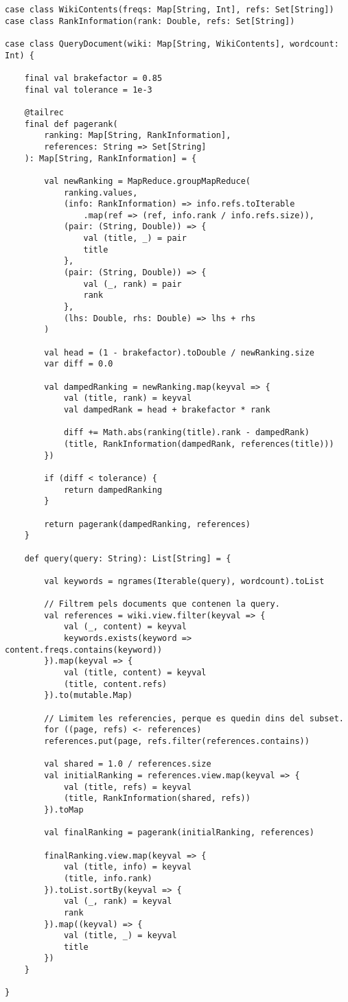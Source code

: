 \documentclass{article}
\begin{document}
\begin{lstlisting}
case class WikiContents(freqs: Map[String, Int], refs: Set[String])
case class RankInformation(rank: Double, refs: Set[String])

case class QueryDocument(wiki: Map[String, WikiContents], wordcount: Int) {

	final val brakefactor = 0.85
	final val tolerance = 1e-3

	@tailrec
	final def pagerank(
		ranking: Map[String, RankInformation],
		references: String => Set[String]
	): Map[String, RankInformation] = {

		val newRanking = MapReduce.groupMapReduce(
			ranking.values,
			(info: RankInformation) => info.refs.toIterable
				.map(ref => (ref, info.rank / info.refs.size)),
			(pair: (String, Double)) => {
				val (title, _) = pair
				title
			},
			(pair: (String, Double)) => {
				val (_, rank) = pair
				rank
			},
			(lhs: Double, rhs: Double) => lhs + rhs
		)

		val head = (1 - brakefactor).toDouble / newRanking.size
		var diff = 0.0

		val dampedRanking = newRanking.map(keyval => {
			val (title, rank) = keyval
			val dampedRank = head + brakefactor * rank

			diff += Math.abs(ranking(title).rank - dampedRank)
			(title, RankInformation(dampedRank, references(title)))
		})

		if (diff < tolerance) {
			return dampedRanking
		}

		return pagerank(dampedRanking, references)
	}

	def query(query: String): List[String] = {

		val keywords = ngrames(Iterable(query), wordcount).toList

		// Filtrem pels documents que contenen la query.
		val references = wiki.view.filter(keyval => {
			val (_, content) = keyval
			keywords.exists(keyword => content.freqs.contains(keyword))
		}).map(keyval => {
			val (title, content) = keyval
			(title, content.refs)
		}).to(mutable.Map)

		// Limitem les referencies, perque es quedin dins del subset.
		for ((page, refs) <- references)
		references.put(page, refs.filter(references.contains))

		val shared = 1.0 / references.size
		val initialRanking = references.view.map(keyval => {
			val (title, refs) = keyval
			(title, RankInformation(shared, refs))
		}).toMap

		val finalRanking = pagerank(initialRanking, references)

		finalRanking.view.map(keyval => {
			val (title, info) = keyval
			(title, info.rank)
		}).toList.sortBy(keyval => {
			val (_, rank) = keyval
			rank
		}).map((keyval) => {
			val (title, _) = keyval
			title
		})
	}

}
\end{lstlisting}
\end{document}
